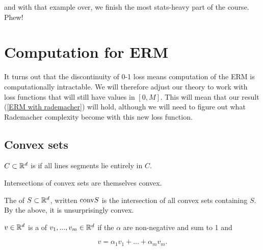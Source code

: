\documentclass[11pt]{scrartcl}
\begin{document}
and with that example over, we finish the most stats-heavy part of the course. Phew!

\section{Computation for ERM}

It turns out that the discontinuity of 0-1 loss means computation of the ERM is computationally intractable. We will therefore adjust our theory to work with  loss functions that will still have values in $[0,M]$. This will mean that our result (\ref{ERM with rademacher}) will hold, although we will need to figure out what Rademacher complexity become with this new loss function.   %


\subsection{Convex sets}

\begin{definition}
$C \subset \mathbb R^d$ is  if all lines segments lie entirely in $C$.
\end{definition}

\begin{example}
Intersections of convex sets are themselves convex.
\end{example}

\begin{definition}
The  of $S \subset \mathbb R^d$, written $\text{conv} S$ is the intersection of all convex sets containing $S$. By the above, it is unsurprisingly convex.
\end{definition}

\begin{definition}
$v \in \mathbb R^d$ is a  of $v_1, ... , v_m \in \mathbb R^d$ if the $\alpha$ are non-negative and sum to 1 and

\begin{equation}
    v = \alpha_1 v_1 + ... + \alpha_m v_m.
\label{convex combination expression} 
\end{equation}
\end{definition}
\end{document}
